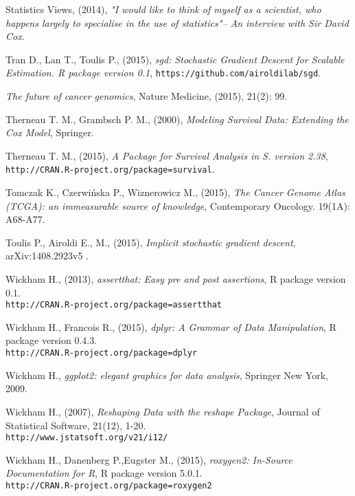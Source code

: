 \begin{thebibliography}{99}
 Statistics Views, (2014), \textit{ "I would like to think of myself as a scientist, who happens largely to specialise in the use of statistics"– An interview with Sir David Cox}.

 Tran D., Lan T., Toulis P., (2015), \textit{sgd: Stochastic Gradient Descent for Scalable Estimation. R package version 0.1}, \texttt{https://github.com/airoldilab/sgd}.


 \textit{The future of cancer genomics}, Nature Medicine, (2015), 21(2): 99.

 Therneau T. M., Grambsch P. M., (2000), \textit{Modeling Survival Data: Extending the Cox Model}, Springer.

 Therneau T. M., (2015), \textit{A Package for Survival Analysis in S. version 2.38}, \\ \texttt{http://CRAN.R-project.org/package=survival}.


 Tomczak K., Czerwińska P., Wiznerowicz M., (2015), \textit{The Cancer Genome Atlas (TCGA): an immeasurable source of knowledge}, Contemporary Oncology. 19(1A): A68-A77.


 Toulis P., Airoldi E., M., (2015), \textit{Implicit stochastic gradient descent}, arXiv:1408.2923v5 .


 Wickham H., (2013), \textit{assertthat: Easy pre and post assertions}, R package version 0.1. \\ \texttt{http://CRAN.R-project.org/package=assertthat}

  Wickham H., Francois R., (2015), \textit{dplyr: A Grammar of Data Manipulation}, R package version 0.4.3. \\  \texttt{http://CRAN.R-project.org/package=dplyr}

 Wickham H., \textit{ggplot2: elegant graphics for data analysis}, Springer New York, 2009.

 Wickham H., (2007), \textit{Reshaping Data with the reshape Package}, Journal of Statistical Software, 21(12), 1-20. \\ \texttt{http://www.jstatsoft.org/v21/i12/}


 Wickham H., Danenberg P.,Eugster M., (2015), \textit{roxygen2: In-Source Documentation for R}, R package version 5.0.1. \\
\texttt{http://CRAN.R-project.org/package=roxygen2}



\end{thebibliography}
